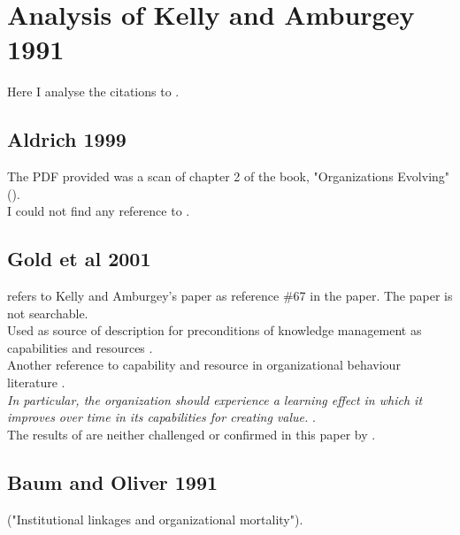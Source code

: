 \section{Analysis of Kelly and Amburgey 1991}

Here I analyse the citations to \cite{kelly1991organizational}.\\

\subsection{Aldrich 1999}

The PDF provided was a scan of chapter 2 of the book, "Organizations Evolving" (\cite{aldrich1999organizations}). \\

I could not find any reference to \cite{kelly1991organizational}.\\

\subsection{Gold et al 2001}

\cite{gold2001knowledge} refers to Kelly and Amburgey's paper as reference \#67 in the paper. The paper is not searchable. \\

Used as source of description for preconditions of knowledge management as capabilities and resources \cite[p.186]{gold2001knowledge}.\\

Another reference to capability and resource in organizational behaviour literature \cite[p.192]{gold2001knowledge}.\\

\textit{In particular, the organization should experience a learning effect in which it improves over time in its capabilities for creating value.} \cite[p.196]{gold2001knowledge}.\\

The results of \cite{kelly1991organizational} are neither challenged or confirmed in this paper by \cite{gold2001knowledge}. \\

\subsection{Baum and Oliver 1991}

\cite{baum1991institutional} ("Institutional linkages and organizational mortality").\\


